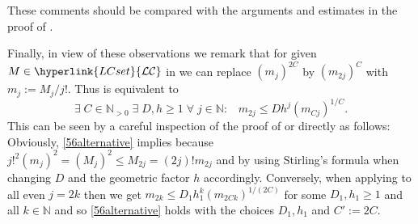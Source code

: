 \documentclass[10pt]{amsart}%
\numberwithin{equation}{section}
\theoremstyle{plain}
\newcommand{\NN}{\mathbb{N}}
\begin{document}
\begin{itemize}
These comments should be compared with the arguments and estimates in the proof of \cite[Thm. 5.1]{Borelmapalgebraity}.

Finally, in view of these observations we remark that for given $M\in\hyperlink{LCset}{\mathcal{LC}}$ in \cite[Prop. 5.2 $(5.6)$]{Borelmapalgebraity} we can replace $(m_j)^{2C}$ by $(m_{2j})^C$ with $m_j:=M_j/j!$. Thus \cite[$(5.6)$]{Borelmapalgebraity} is equivalent to
\begin{equation}\label{56alternative}
\exists\;C\in\NN_{>0}\;\exists\;D,h\ge 1\;\forall\;j\in\NN:\;\;\;m_{2j}\le Dh^j(m_{Cj})^{1/C}.
\end{equation}
This can be seen by a careful inspection of the proof of \cite[Prop. 5.2]{Borelmapalgebraity} or directly as follows: Obviously, \eqref{56alternative} implies \cite[$(5.6)$]{Borelmapalgebraity} because $j!^2(m_j)^2=(M_j)^2\le M_{2j}=(2j)!m_{2j}$ and by using Stirling's formula when changing $D$ and the geometric factor $h$ accordingly. Conversely, when applying \cite[$(5.6)$]{Borelmapalgebraity} to all even $j=2k$ then we get $m_{2k}\le D_1h_1^k(m_{2Ck})^{1/(2C)}$ for some $D_1,h_1\ge 1$ and all $k\in\NN$ and so \eqref{56alternative} holds with the choices $D_1,h_1$ and $C':=2C$.
\end{itemize}








\end{document}
